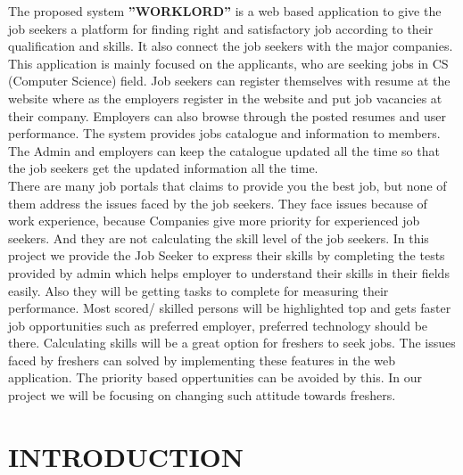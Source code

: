 \documentclass[a4paper,12pt]{report}
\begin{document}
The proposed system {\bf ”WORKLORD”} is a web based application to give the
job seekers a platform for finding right and satisfactory job according to their qualification and skills. It also connect the job seekers with the major companies. This application is mainly focused on the applicants, who are seeking jobs in CS (Computer
Science) field. Job seekers can register themselves with resume at the website where as the
employers register in the website and put job vacancies at their
company. Employers can also browse through the posted resumes and user performance. The system provides jobs catalogue and information to members. The Admin and employers can
keep the catalogue updated all the time so that the job seekers get the updated information all the time.\\

There are many job portals that claims to provide you the best job, but none
of them address the issues faced by the job seekers. They face issues because of work experience, because Companies give more priority for experienced job seekers. And they are not calculating the skill level of the job seekers. In this project we provide the Job Seeker to express their skills by completing the tests provided by admin which helps employer to understand their skills in their fields easily. Also they will
be getting tasks to complete for measuring their performance. Most
scored/ skilled persons will be highlighted top and gets faster job opportunities such as preferred employer, preferred technology should be there. Calculating skills will be a great option for freshers to seek jobs. The issues faced by freshers can solved by implementing these features in the web application. The priority based oppertunities can be avoided by this. In our project we will be focusing on changing
such attitude towards freshers.\\


\pagebreak

\tableofcontents{}
\pagebreak

\listoffigures

\pagebreak

\listoftables

\pagebreak
{}

\chapter{INTRODUCTION}
\end{document}
